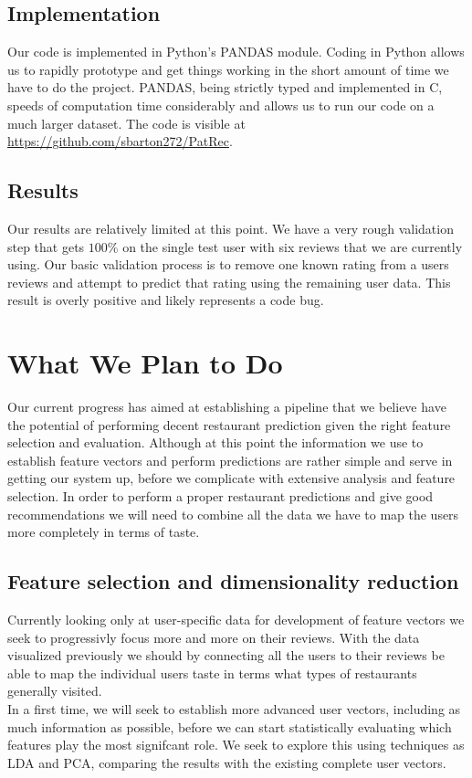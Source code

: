 \documentclass[10pt,twocolumn,letterpaper]{article}
\begin{document}
\subsection{Implementation}
Our code is implemented in Python's PANDAS module. Coding in Python allows us to rapidly prototype and get things working in the short amount of time we have to do the project. PANDAS, being strictly typed and implemented in C, speeds of computation time considerably and allows us to run our code on a much larger dataset. The code is visible at \url{https://github.com/sbarton272/PatRec}.
\subsection{Results}
Our results are relatively limited at this point. We have a very rough validation step that gets $100\%$ on the single test user with six reviews that we are currently using. Our basic validation process is to remove one known rating from a users reviews and attempt to predict that rating using the remaining user data. This result is overly positive and likely represents a code bug.

\section{What We Plan to Do}
Our current progress has aimed at establishing a pipeline that we believe have the potential of performing decent restaurant prediction given the right feature selection and evaluation. Although at this point the information we use to establish feature vectors and perform predictions are rather simple and serve in getting our system up, before we complicate with extensive analysis and feature selection. In order to perform a proper restaurant predictions and give good recommendations we will need to combine all the data we have to map the users more completely in terms of taste.

\subsection{Feature selection and dimensionality reduction}
Currently looking only at user-specific data for development of feature vectors we seek to progressivly focus more and more on their reviews. With the data visualized previously we should by connecting all the users to their reviews be able to map the individual users taste in terms what types of restaurants generally visited. 
\\[.5em]
\indent In a first time, we will seek to establish more advanced user vectors, including as much information as possible, before we can start statistically evaluating which features play the most signifcant role. We seek to explore this using techniques as LDA and PCA, comparing the results with the existing complete user vectors.
\end{document}

